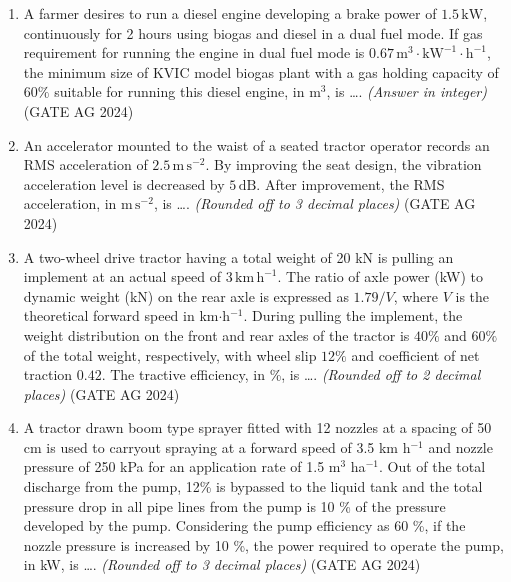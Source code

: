 \documentclass[journal]{IEEEtran}
\begin{document}
\begin{enumerate}
 \medskip

\item 
A farmer desires to run a diesel engine developing a brake power of $1.5\, \text{kW}$, continuously for 2 hours using biogas and diesel in a dual fuel mode. If gas requirement for running the engine in dual fuel mode is $0.67\, \text{m}^3\cdot \text{kW}^{-1}\cdot \text{h}^{-1}$, the minimum size of KVIC model biogas plant with a gas holding capacity of $60\%$ suitable for running this diesel engine, in m$^3$, is \dots. \textit{(Answer in integer)}
 \hfill(GATE AG 2024)\\

 \medskip

\item
An accelerator mounted to the waist of a seated tractor operator records an RMS acceleration of $2.5\, \text{m}\,\text{s}^{-2}$. By improving the seat design, the vibration acceleration level is decreased by $5\, \text{dB}$. After improvement, the RMS acceleration, in $\text{m}\,\text{s}^{-2}$, is \dots. \textit{(Rounded off to 3 decimal places)}
 \hfill(GATE AG 2024)\\

 \medskip

\item
A two-wheel drive tractor having a total weight of 20 kN is pulling an implement at an actual speed of $3\, \text{km}\,\text{h}^{-1}$. The ratio of axle power (kW) to dynamic weight (kN) on the rear axle is expressed as $1.79/V$, where $V$ is the theoretical forward speed in km$\cdot$h$^{-1}$. During pulling the implement, the weight distribution on the front and rear axles of the tractor is $40\%$ and $60\%$ of the total weight, respectively, with wheel slip $12\%$ and coefficient of net traction $0.42$. The tractive efficiency, in \%, is \dots. \textit{(Rounded off to 2 decimal places)}
 \hfill(GATE AG 2024)\\

\medskip

\item
A tractor drawn boom type sprayer fitted with 12 nozzles at a spacing of 50 cm is used to carryout spraying at a forward speed of 3.5 km h$^{-1}$ and nozzle pressure of 250 kPa for an application rate of 1.5 m$^{3}$ ha$^{-1}$. Out of the total discharge from the pump, 12\% is bypassed to the liquid tank and the total pressure drop in all pipe lines from the pump is 10 \% of the pressure developed by the pump. Considering the pump efficiency as 60 \%, if the nozzle pressure is increased by 10 \%, the power required to operate the pump, in kW, is \dots. \textit{(Rounded off to 3 decimal places)}
 \hfill(GATE AG 2024)\\


\end{enumerate}
\end{document}
